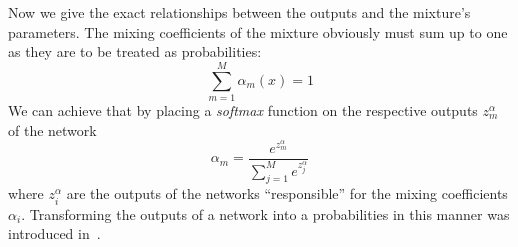 \documentclass[12pt,a4paper,twoside]{scrartcl}
\numberwithin{equation}{section}
\begin{document}
Now we give the exact relationships between the outputs and the mixture's parameters. The mixing coefficients of the mixture obviously must sum up to one as they are to be treated as probabilities:
\begin{equation}
  \sum_{m=1}^M\alpha_m(x)=1
\end{equation}
We can achieve that by placing a \emph{softmax} function on the respective outputs \(z_m^{\alpha} \) of the network 
\begin{equation}
  \alpha_m = \frac{e^{z_m^{\alpha}}}{\sum_{j=1}^M e^{z_j^{\alpha}}}
\end{equation}
where \(z_i^{\alpha}\) are the outputs of the networks ``responsible'' for the mixing coefficients \(\alpha_i\). Transforming the outputs of a network into a probabilities in this manner was introduced in~\cite{bridle1990}.
\end{document}

